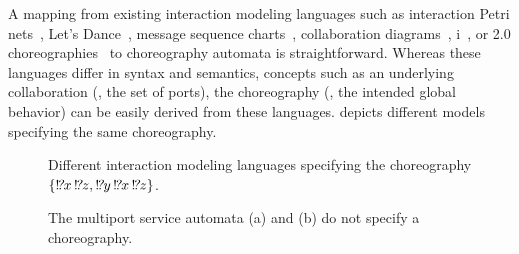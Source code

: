 A mapping from existing interaction modeling languages such as interaction Petri nets~\cite{DeckerW_2007_bpm}, Let's Dance~\cite{ZahaBDH_2006_otm}, message sequence charts~\cite{AlurEY_2003_tse}, collaboration diagrams~\cite{BultanF_2008_soca}, i~\cite{DeckerB_2007_bpmw}, or  2.0 choreographies~\cite{standard_bpmn2} to choreography automata is straightforward. Whereas these languages differ in syntax and semantics, concepts such as an underlying collaboration (\ie, the set of ports), the choreography (\ie, the intended global behavior) can be easily derived from these languages.  depicts different models specifying the same choreography.

\begin{figure}[tb]
\centering
{}
\hfill
{}
\hfill
{}\hfill
{}
\caption{Different interaction modeling languages specifying the choreography $\{{!\!\textsl{?} x\,!\!\textsl{?} z}, {!\!\textsl{?} y\,!\!\textsl{?} x\,!\!\textsl{?} z}\}$.}
\label{fig:realizability_example}
\end{figure}

\begin{figure}
\centering
{}\hfill
{}
\caption{The multiport service automata (a) and (b) do not specify a choreography.}
\label{fig:realizability_nochor}
\end{figure}

